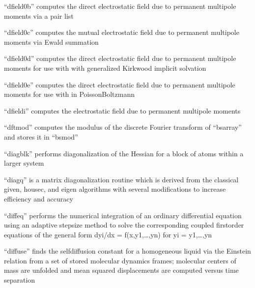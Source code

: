 \documentclass[letterpaper,11pt,english]{sphinxmanual}
\begin{document}
\sphinxAtStartPar
“dfield0b” computes the direct electrostatic field due to permanent multipole moments via a pair list

\sphinxAtStartPar
{}

\sphinxAtStartPar
“dfield0c” computes the mutual electrostatic field due to permanent multipole moments via Ewald summation

\sphinxAtStartPar
{}

\sphinxAtStartPar
“dfield0d” computes the direct electrostatic field due to permanent multipole moments for use with with generalized Kirkwood implicit solvation

\sphinxAtStartPar
{}

\sphinxAtStartPar
“dfield0e” computes the direct electrostatic field due to permanent multipole moments for use with in Poisson\sphinxhyphen{}Boltzmann

\sphinxAtStartPar
{}

\sphinxAtStartPar
“dfieldi” computes the electrostatic field due to permanent multipole moments

\sphinxAtStartPar
{}

\sphinxAtStartPar
“dftmod” computes the modulus of the discrete Fourier transform of “bsarray” and stores it in “bsmod”

\sphinxAtStartPar
{}

\sphinxAtStartPar
“diagblk” performs diagonalization of the Hessian for a block of atoms within a larger system

\sphinxAtStartPar
{}

\sphinxAtStartPar
“diagq” is a matrix diagonalization routine which is derived from the classical given, housec, and eigen algorithms with several modifications to increase efficiency and accuracy

\sphinxAtStartPar
{}

\sphinxAtStartPar
“diffeq” performs the numerical integration of an ordinary differential equation using an adaptive stepsize method to solve the corresponding coupled first\sphinxhyphen{}order equations of the general form dyi/dx = f(x,y1,…,yn) for yi = y1,…,yn

\sphinxAtStartPar
{}

\sphinxAtStartPar
“diffuse” finds the self\sphinxhyphen{}diffusion constant for a homogeneous liquid via the Einstein relation from a set of stored molecular dynamics frames; molecular centers of mass are unfolded and mean squared displacements are computed versus time separation
\end{document}
